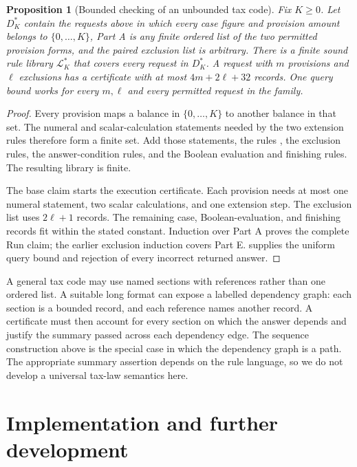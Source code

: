 \documentclass[11pt,twoside]{article}
\newtheorem{proposition}[theorem]{Proposition}
\theoremstyle{definition}
\newcommand{\Lib}{\mathcal L}
\begin{document}
\begin{proposition}[Bounded checking of an unbounded tax code]
\label{prop:long-code}
Fix $K\ge0$. Let $D^*_K$ contain the requests above in which every case figure
and provision amount belongs to $\{0,\ldots,K\}$, Part A is any finite ordered
list of the two permitted provision forms, and the paired exclusion list is
arbitrary. There is a finite sound rule library $\Lib^*_K$ that covers every
request in $D^*_K$. A request with $m$ provisions and $\ell$ exclusions has a
certificate with at most $4m+2\ell+32$ records. One query bound works for every
$m,\ell$ and every permitted request in the family.
\end{proposition}
\begin{proof}
Every provision maps a balance in $\{0,\ldots,K\}$ to another balance in that
set. The numeral and scalar-calculation statements needed by the two extension
rules therefore form a finite set. Add those statements, the rules
, the exclusion rules, the
answer-condition rules, and the Boolean evaluation and finishing rules. The
resulting library is finite.

The base claim starts the execution certificate. Each provision needs at most
one numeral statement, two scalar calculations, and one extension step. The
exclusion list uses $2\ell+1$ records. The remaining case, Boolean-evaluation,
and finishing records fit within the stated constant. Induction over Part A
proves the complete $\mathrm{Run}$ claim; the earlier exclusion induction
covers Part E.  supplies the uniform query bound and
rejection of every incorrect returned answer.
\end{proof}

A general tax code may use named sections with references rather than one
ordered list. A suitable long format can expose a labelled dependency graph:
each section is a bounded record, and each reference names another record. A
certificate must then account for every section on which the answer depends
and justify the summary passed across each dependency edge. The sequence
construction above is the special case in which the dependency graph is a
path. The appropriate summary assertion depends on the rule language, so we
do not develop a universal tax-law semantics here.

\section{Implementation and further development}
\end{document}
